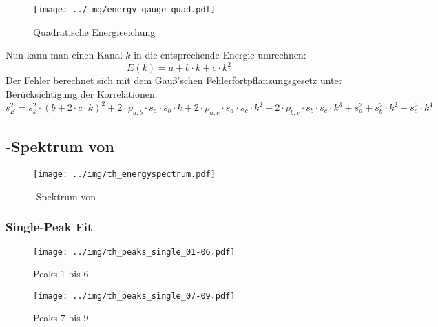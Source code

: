 \begin{figure}[H]
\begin{center}
  \texttt{[image: ../img/energy\_gauge\_quad.pdf]}
  \caption{Quadratische Energieeichung}
  \label{img:gauge:quad}
\end{center}
\end{figure}
Nun kann man einen Kanal $k$ in die entsprechende Energie umrechnen:
\begin{equation}
\label{eq:energygauge}
  E(k) = a + b \cdot k + c \cdot k^2
\end{equation}
Der Fehler berechnet sich mit dem Gauß'schen Fehlerfortpflanzungsgesetz unter Berücksichtigung der Korrelationen:
\begin{equation}
\label{eq:energygauge:error}
  s_E^2 = s_{k}^2 \cdot (b + 2 \cdot c \cdot k)^2 + 2 \cdot \rho_{a, b} \cdot s_{a} \cdot s_{b} \cdot k + 2 \cdot \rho_{a, c} \cdot s_{a} \cdot s_{c} \cdot k^2 +
  2 \cdot \rho_{b, c} \cdot s_{b} \cdot s_{c} \cdot k^3 + s_{a}^2 + s_{b}^2 \cdot k^2 + s_{c}^2 \cdot k^4
\end{equation}

\subsection{\textgamma-Spektrum von }
\begin{figure}[H]
\begin{center}
  \texttt{[image: ../img/th\_energyspectrum.pdf]}
  \caption{\textgamma-Spektrum von }
  \label{img:th:spectrum}
\end{center}
\end{figure}

\subsubsection{Single-Peak Fit} %
\begin{figure}[H]
\begin{center}
  \texttt{[image: ../img/th\_peaks\_single\_01-06.pdf]}
  \caption{Peaks 1 bis 6}
  \label{img:th:peaks:single:0106}
\end{center}
\end{figure}

\begin{figure}[H]
\begin{center}
  \texttt{[image: ../img/th\_peaks\_single\_07-09.pdf]}
  \caption{Peaks 7 bis 9}
  \label{img:th:peaks:single:0709}
\end{center}
\end{figure}

